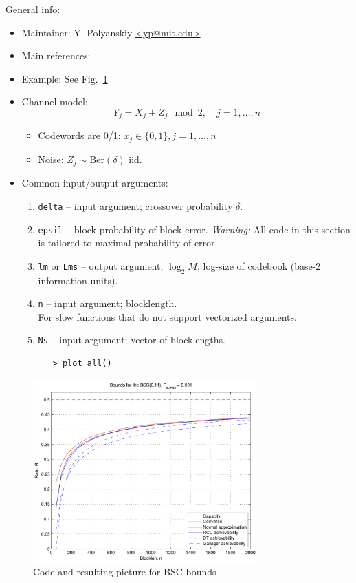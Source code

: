 \documentclass[a4paper,11p]{memoir}
\begin{document}
General info:
\begin{itemize}
\item Maintainer: Y. Polyanskiy \url{<yp@mit.edu>}

\item Main references: \cite{PPV08}

\item Example: See Fig.~\ref{fig:bsc_example} 

\item Channel model:
	$$ Y_j = X_j + Z_j \mod 2, \quad j=1,\ldots,n $$
	\begin{itemize}
	\item Codewords are 0/1: $x_j \in \{0,1\}, j=1,\ldots,n$
	\item Noise: $Z_j \sim \mathrm{Ber}(\delta)$ iid.\\
	\end{itemize}

\item Common input/output arguments:
\begin{enumerate}
\item \verb|delta| -- input argument; crossover probability $\delta$.
\item \verb|epsil| -- block probability of block error. \textit{Warning:} All code in this section is tailored to
maximal probability of error.
\item \verb|lm| or \verb|Lms| -- output argument; $\log_2 M$, log-size of codebook (base-2 information units). 
\item \verb|n| -- input argument; blocklength.\\
		For slow functions that do not support vectorized arguments.
\item \verb|Ns| -- input argument; vector of blocklengths.
\end{enumerate}
\end{itemize}


\begin{figure}
\centering
\begin{verbatim}
	> plot_all()
\end{verbatim}
\includegraphics[height=7cm]{plots/bsc_example}
\caption{Code and resulting picture for BSC bounds}\label{fig:bsc_example}
\end{figure}
\end{document}
